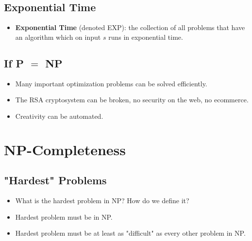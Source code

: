 \subsection{Exponential Time}
\begin{itemize}
    \item \textbf{Exponential Time} (denoted EXP): the collection of all problems that have an algorithm which on input $s$ runs in exponential time.
\end{itemize}

\subsection{If P $=$ NP}
\begin{itemize}
    \item Many important optimization problems can be solved efficiently.
    \item The RSA cryptosystem can be broken, no security on the web, no ecommerce.
    \item Creativity can be automated.
\end{itemize}

\section{NP-Completeness}

\subsection{"Hardest" Problems}
\begin{itemize}
    \item What is the hardest problem in NP? How do we define it?
    \item Hardest problem must be in NP.
    \item Hardest problem must be at least as "difficult" as every other problem in NP.
\end{itemize}

